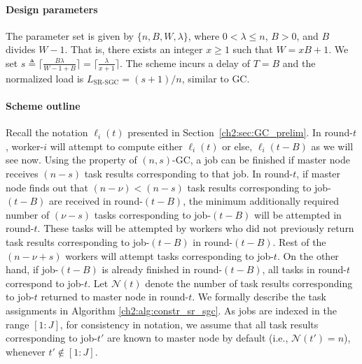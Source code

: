 \paragraph{Design parameters}  The parameter set is given by $\{n,B,W,\lambda\}$, where $0<\lambda\leq n$, $B>0$, and $B$ divides $W-1$. That is, there exists an integer $x\geq1$ such that $W=xB+1$. We set $s\triangleq \lceil\frac{B\lambda}{W-1+B}\rceil=\lceil\frac{\lambda}{x+1}\rceil$. The scheme incurs a delay of $T= B$ and the normalized load is $L_\text{SR-SGC}=({s+1})/{n}$, similar to GC.

\paragraph{Scheme outline} Recall the notation $\ell_i(t)$ presented in Section~\ref{ch2:sec:GC_prelim}. In round-$t$, worker-$i$ will attempt to compute either $\ell_i(t)$ or else, $\ell_i(t-B)$ as we will see now. Using the property of $(n,s)$-GC, a job can be finished if master node receives $(n-s)$ task results corresponding to that job. In round-$t$, if master node finds out that $(n-\nu)<(n-s)$ task results corresponding to job-$(t-B)$ are received in round-$(t-B)$, the minimum additionally required number of $(\nu-s)$ tasks corresponding to job-$(t-B)$ will be attempted in round-$t$. These tasks will be attempted by workers who did not previously return task results corresponding to job-$(t-B)$ in round-$(t-B)$. Rest of the $(n-\nu+s)$ workers will attempt tasks corresponding to job-$t$. On the other hand, if job-$(t-B)$ is already finished in round-$(t-B)$, all tasks in round-$t$ correspond to job-$t$. Let $\mathcal{N}(t)$ denote the number of task results corresponding to job-$t$ returned to master node in round-$t$. We formally describe the task assignments in Algorithm \ref{ch2:alg:constr_sr_sgc}. As jobs are indexed in the range $[1:J]$, for consistency in notation, we assume that all task results corresponding to job-$t'$ are known to master node by default (i.e., $\mathcal{N}(t')= n$), whenever $t'\notin[1:J]$.


